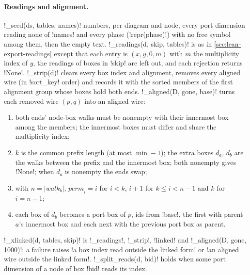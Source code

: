 {{{\paragraph{Readings and alignment.} \lexpy!_seed(ds, tables, names)! numbers, per diagram and node,
every port dimension reading none of \lexcode!names! and every phase (\lexpy!repr(phase)!) with no free
symbol among them, then the empty text. \lexpy!_readings(d, skip, tables)! is as in
\cref{sec:lean-export-readings} except that each entry is $(x, y, 0, m)$ with $m$ the multiplicity
index of $y$, the readings of boxes in \lexcode!skip! are left out, and each rejection returns
\lexpy!None!. \lexpy!_strip(d)! clears every box index and alignment, removes every aligned wire (in
\lexpy!sort_key! order) and records it with the sorted members of the first alignment group whose
boxes hold both ends. \lexpy!_aligned(D, gone, base)! turns each removed wire $(p, q)$ into an
aligned wire:
\begin{enumerate}
\item both ends' node-box walks must be nonempty with their innermost box among the members; the
innermost boxes must differ and share the multiplicity index;
\item $k$ is the common prefix length (at most $\min - 1$); the extra boxes $d_a$, $d_b$ are the
walks between the prefix and the innermost box; both nonempty gives \lexpy!None!; when $d_a$ is
nonempty the ends swap;
\item with $n = |\mathit{walk}_b|$, $\mathit{perm}_i = i$ for $i < k$, $i + 1$ for $k \le i < n-1$
and $k$ for $i = n - 1$;
\item each box of $d_b$ becomes a port box of $p$, ids from \lexcode!base!, the first with parent
$a$'s innermost box and each next with the previous port box as parent.
\end{enumerate}
\lexpy!_xlinked(d, tables, skip)! is \lexpy!_readings!, \lexpy!_strip!, \lexpy!linked! and \lexpy!_aligned(D, gone, 1000)!;
a failure raises \lexcode!a box index read outside the linked form! or
\lexcode!an aligned wire outside the linked form!. \lexpy!_split_reads(d, bid)! holds when some port
dimension of a node of box \lexcode!bid! reads its index.

}}}
